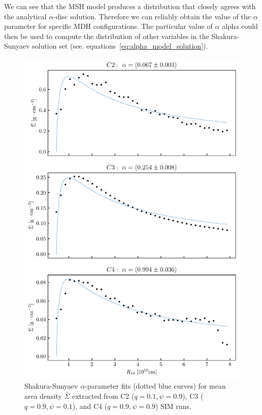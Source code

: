     We can see that the MSH model produces a distribution that closely agrees with the analytical $\alpha$-disc solution. Therefore we can reliably obtain the value of the $\alpha$ parameter for specific MDH configurations. The particular value of $\alpha$ alpha could then be used to compute the distribution of other variables in the Shakura-Sunyaev solution set (see. equations~\eqref{eq:alpha_model_solution}).  
    
    \begin{figure}[H]
    \begin{center}
    \includegraphics{img/plot_mean_density_fit.pdf}
    \end{center}
        \caption{Shakura-Sunyaev $\alpha$-parameter fits (dotted blue curves) for mean area density $\bar{\Sigma}$ extracted from C2 ($q=0.1, \psi=0.9$), C3 ($q=0.9, \psi=0.1$), and C4 ($q=0.9, \psi=0.9$) SIM runs. }
    \label{fig:plot_mean_density_fit}
    \end{figure}
